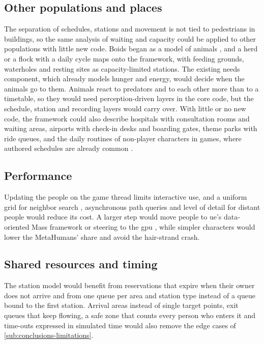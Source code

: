 \subsection{Other populations and places}\label{sub:future-generality}

The separation of schedules, stations and movement is not tied to pedestrians in buildings, so the same analysis of waiting and capacity could be applied to other populations with little new code. Boids began as a model of animals \citep{reynolds1987flocks}, and a herd or a flock with a daily cycle maps onto the framework, with feeding grounds, waterholes and resting sites as capacity-limited stations. The existing needs component, which already models hunger and energy, would decide when the animals go to them. Animals react to predators and to each other more than to a timetable, so they would need perception-driven layers in the core code, but the schedule, station and recording layers would carry over. With little or no new code, the framework could also describe hospitals with consultation rooms and waiting areas, airports with check-in desks and boarding gates, theme parks with ride queues, and the daily routines of non-player characters in games, where authored schedules are already common \citep{bethesda2011skyrim,concernedape2016stardew}.

\subsection{Performance}\label{sub:future-performance}

Updating the people on the game thread limits interactive use, and a uniform grid for neighbor search \citep{reynolds2006big,ericson2004realtime}, asynchronous path queries and level of detail for distant people would reduce its cost. A larger step would move people to \gls{ue}'s data-oriented Mass framework \citep{epicgames2026massentity,epicgames2026massgameplay} or steering to the \gls{gpu} \citep{owens2007survey,joselli2009neighborhood}, while simpler characters would lower the MetaHumans' share and avoid the hair-strand crash.

\subsection{Shared resources and timing}\label{sub:future-resources}

The station model would benefit from reservations that expire when their owner does not arrive and from one queue per area and station type instead of a queue bound to the first station. Arrival areas instead of single target points, exit queues that keep flowing, a safe zone that counts every person who enters it and time-outs expressed in simulated time would also remove the edge cases of \cref{sub:conclusions-limitations}.

